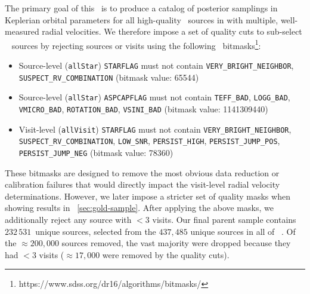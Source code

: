 \documentclass[modern]{aastex63}
\newcommand{\nsources}{\ensuremath{232\,531}}
\begin{document}
The primary goal of this \documentname\ is to produce a catalog of posterior
samplings in Keplerian orbital parameters for all high-quality \apogee\ sources
in  with multiple, well-measured radial velocities.
We therefore impose a set of quality cuts to sub-select \apogee\  sources
by rejecting sources or visits using the following \apogee\
bitmasks\footnote{https://www.sdss.org/dr16/algorithms/bitmasks/}:
\begin{itemize}
    \item Source-level (\texttt{allStar}) \texttt{STARFLAG} must not contain
    \texttt{VERY\_BRIGHT\_NEIGHBOR}, \texttt{SUSPECT\_RV\_COMBINATION} (bitmask
    value: 65544)
    \item Source-level (\texttt{allStar}) \texttt{ASPCAPFLAG} must not contain
    \texttt{TEFF\_BAD}, \texttt{LOGG\_BAD}, \texttt{VMICRO\_BAD},
    \texttt{ROTATION\_BAD}, \texttt{VSINI\_BAD} (bitmask value: 1141309440)
    \item Visit-level (\texttt{allVisit}) \texttt{STARFLAG} must not contain
    \texttt{VERY\_BRIGHT\_NEIGHBOR}, \texttt{SUSPECT\_RV\_COMBINATION},
    \texttt{LOW\_SNR}, \texttt{PERSIST\_HIGH}, \texttt{PERSIST\_JUMP\_POS},
    \texttt{PERSIST\_JUMP\_NEG} (bitmask value: 78360)
\end{itemize}
These bitmasks are designed to remove the most obvious data reduction or
calibration failures that would directly impact the visit-level radial velocity
determinations.
However, we later impose a stricter set of quality masks when showing results in
\sectionname~\ref{sec:gold-sample}.
After applying the above masks, we additionally reject any source with $<3$
visits.
Our final parent sample contains \nsources\ unique sources, selected from the
$437,485$ unique sources in all of \apogee\ \dr{16}.
Of the $\approx$$200,000$ sources removed, the vast majority were dropped
because they had $<3$ visits ($\approx$$17,000$ were removed by the quality
cuts).
\end{document}
